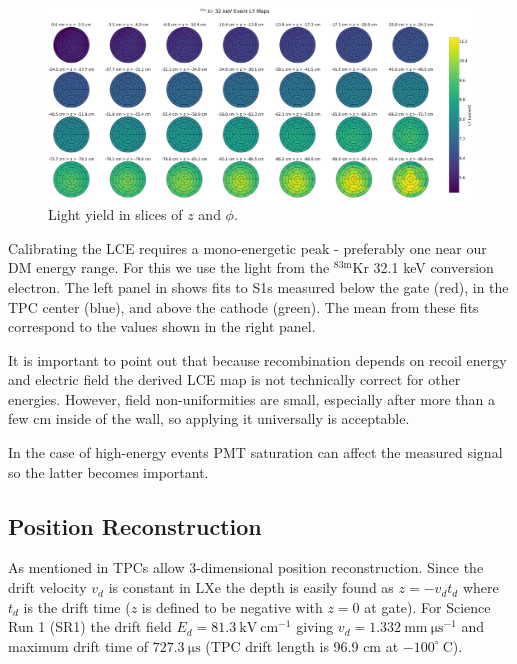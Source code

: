 \begin{figure}
\centering
\includegraphics[width=\textwidth]{LCEMapPolar}
\caption{Light yield in slices of $z$ and $\phi$.}
\label{fig:calibrations_lce_polar}
\end{figure}

Calibrating the LCE requires a mono-energetic peak - preferably one near our DM energy range.  For this we use the light from the
$\mathrm{^{83m}Kr}$ 32.1 keV conversion electron.  The left panel in  shows fits to S1s measured below the gate
(red), in the TPC center (blue), and above the cathode (green).  The mean from these fits correspond to the values shown in the right
panel.

It is important to point out that because recombination depends on recoil energy and electric field the derived LCE map is not
technically correct for other energies.  However, field non-uniformities are small, especially after more than a few cm inside of the
wall, so applying it universally is acceptable.

In the case of high-energy events PMT saturation can
affect the measured signal so the latter becomes important.



\subsection{Position Reconstruction}
\label{subsec:det_char_position_reconstruction}
As mentioned in  TPCs allow 3-dimensional position reconstruction.  Since the drift velocity $v_d$
is constant in LXe the depth is easily found as $z = -v_d t_d$ where $t_d$ is the drift time ($z$ is defined to be negative with
$z = 0$ at gate).  For Science Run 1 (SR1) the drift field $E_d = 81.3\ \mathrm{kV\ cm^{-1}}$ giving
$v_d = 1.332\ \mathrm{mm\ \mu s^{-1}}$ and maximum drift time of $727.3\ \mathrm{\mu s}$ (TPC drift length is 96.9 cm at
$-100^{\circ}\ \mathrm{C}$).

